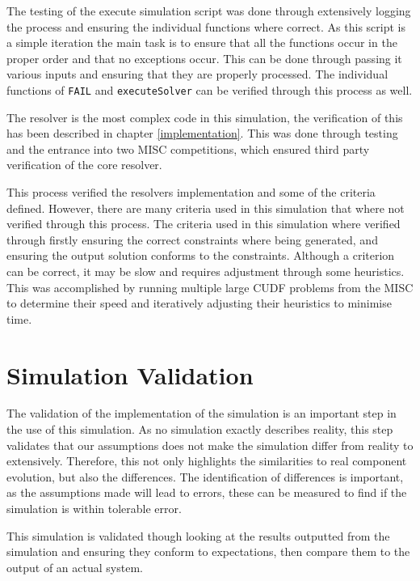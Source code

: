 The testing of the execute simulation script was done through extensively logging the process and ensuring the individual functions where correct.
As this script is a simple iteration the main task is to ensure that all the functions occur in the proper order and that no exceptions occur.
This can be done through passing it various inputs and ensuring that they are properly processed.
The individual functions of \verb+FAIL+ and \verb+executeSolver+ can be verified through this process as well.


The resolver is the most complex code in this simulation, the verification of this has been described in chapter \ref{implementation}.
This was done through testing and the entrance into two MISC competitions, which ensured third party verification of the core resolver.

This process verified the resolvers implementation and some of the criteria defined.
However, there are many criteria used in this simulation that where not verified through this process.
The criteria used in this simulation where verified through firstly ensuring the correct constraints where being generated, 
and ensuring the output solution conforms to the constraints.
Although a criterion can be correct, it may be slow and requires adjustment through some heuristics.
This was accomplished by running multiple large CUDF problems from the MISC to determine their speed and iteratively adjusting their heuristics to minimise time. 

\section{Simulation Validation}
The validation of the implementation of the simulation is an important step in the use of this simulation.
As no simulation exactly describes reality, this step validates that our assumptions does not make the simulation differ from reality to extensively.
Therefore, this not only highlights the similarities to real component evolution, but also the differences.
The identification of differences is important, as the assumptions made will lead to errors, these can be measured to find if the simulation is within tolerable error. 

This simulation is validated though looking at the results outputted from the simulation and ensuring they conform to expectations, 
then compare them to the output of an actual system.

